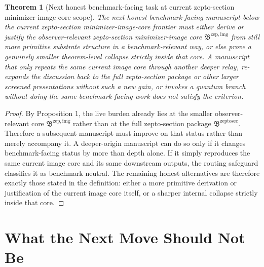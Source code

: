 \documentclass[11pt]{article}
\newcommand{\ZeptoSectionPackage}{\mathfrak B^{\mathrm{zeptosec}}}
\newcommand{\ZeptoImageCore}{\mathfrak B^{\mathrm{zep,img}}}
\newtheorem{theorem}{Theorem}
\begin{document}
\begin{theorem}[Next honest benchmark-facing task at current zepto-section minimizer-image-core scope]
The next honest benchmark-facing manuscript below the current zepto-section minimizer-image-core frontier must either derive or justify the observer-relevant zepto-section minimizer-image core \(\ZeptoImageCore\) from still more primitive substrate structure in a benchmark-relevant way, or else prove a genuinely smaller theorem-level collapse strictly inside that core. A manuscript that only repeats the same current image core through another deeper relay, re-expands the discussion back to the full zepto-section package or other larger screened presentations without such a new gain, or invokes a quantum branch without doing the same benchmark-facing work does not satisfy the criterion.
\end{theorem}

\begin{proof}
By Proposition 1, the live burden already lies at the smaller observer-relevant core \(\ZeptoImageCore\) rather than at the full zepto-section package \(\ZeptoSectionPackage\). Therefore a subsequent manuscript must improve on that status rather than merely accompany it. A deeper-origin manuscript can do so only if it changes benchmark-facing status by more than depth alone. If it simply reproduces the same current image core and its same downstream outputs, the routing safeguard classifies it as benchmark neutral. The remaining honest alternatives are therefore exactly those stated in the definition: either a more primitive derivation or justification of the current image core itself, or a sharper internal collapse strictly inside that core.
\end{proof}

\section{What the Next Move Should Not Be}
\end{document}
